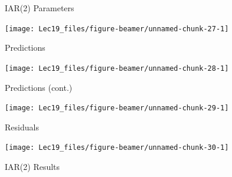 \documentclass[11pt,ignorenonframetext,]{beamer}
\newenvironment{Shaded}{}{}
\newcommand{\CommentTok}[1]{\textcolor[rgb]{0.38,0.63,0.69}{\textit{#1}}}
\newcommand{\DecValTok}[1]{\textcolor[rgb]{0.25,0.63,0.44}{#1}}
\newcommand{\KeywordTok}[1]{\textcolor[rgb]{0.00,0.44,0.13}{\textbf{#1}}}
\newcommand{\NormalTok}[1]{#1}
\newcommand{\OperatorTok}[1]{\textcolor[rgb]{0.40,0.40,0.40}{#1}}
\newcommand{\StringTok}[1]{\textcolor[rgb]{0.25,0.44,0.63}{#1}}
\let\oldShaded\Shaded
\let\endoldShaded\endShaded
\renewenvironment{Shaded}{\footnotesize\begin{spacing}{0.9}\oldShaded}{\endoldShaded\end{spacing}}
\begin{document}
\begin{frame}{IAR(2) Parameters}
\protect\hypertarget{iar2-parameters}{}

\begin{center}\texttt{[image: Lec19\_files/figure-beamer/unnamed-chunk-27-1]} \end{center}

\end{frame}

\begin{frame}{Predictions}
\protect\hypertarget{predictions-1}{}

\begin{center}\texttt{[image: Lec19\_files/figure-beamer/unnamed-chunk-28-1]} \end{center}

\end{frame}

\begin{frame}{Predictions (cont.)}
\protect\hypertarget{predictions-cont.}{}

\begin{center}\texttt{[image: Lec19\_files/figure-beamer/unnamed-chunk-29-1]} \end{center}

\end{frame}

\begin{frame}{Residuals}
\protect\hypertarget{residuals-1}{}

\begin{center}\texttt{[image: Lec19\_files/figure-beamer/unnamed-chunk-30-1]} \end{center}

\end{frame}

\begin{frame}[fragile,t]{IAR(2) Results}
\protect\hypertarget{iar2-results}{}

\begin{Shaded}
\end{Shaded}

\end{frame}
\end{document}
